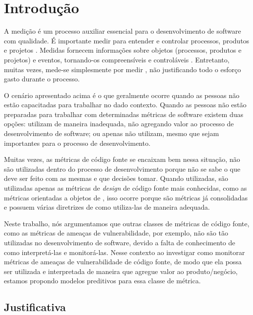 \chapter{Introdução} \label{cap:introducao}

A medição é um processo auxiliar essencial para o desenvolvimento de software
com qualidade. É importante medir para entender e controlar processos, produtos 
e projetos \cite{ministerio_processo2012}. Medidas fornecem informações sobre 
objetos (processos, produtos e projetos) e eventos, tornando-os compreensíveis 
e controláveis \cite{fenton&pfleenger98}. Entretanto, muitas vezes, mede-se
simplesmente por medir \cite{ministerio_processo2012}, não justificando todo o 
esforço gasto durante o processo.

O cenário apresentado acima é o que geralmente ocorre quando as pessoas não estão
capacitadas para trabalhar no dado contexto. Quando as pessoas não estão
preparadas para trabalhar com determinadas métricas de software existem duas opções:
utilizam de maneira inadequada, não agregando valor ao processo de desenvolvimento
de software; ou apenas não utilizam, mesmo que sejam importantes para o processo de
desenvolvimento.

Muitas vezes, as métricas de código fonte se encaixam bem nessa situação, não
são utilizadas dentro do processo de desenvolvimento porque não se sabe o que
deve ser feito com as mesmas e que decisões tomar. Quando utilizadas, são
utilizadas apenas as métricas de \textit{design} de código fonte mais
conhecidas, como as métricas orientadas a objetos de
, isso ocorre porque são métricas já
consolidadas e possuem várias diretrizes de como utiliza-las de maneira
adequada. 

Neste trabalho, nós argumentamos que outras classes de métricas de código fonte,
como as métricas de ameaças de vulnerabilidade, por exemplo, não são tão
utilizadas no desenvolvimento de software, devido a falta de conhecimento de
como interpretá-las e monitorá-las. Nesse contexto ao investigar como monitorar
métricas de ameaças de vulnerabilidade de código fonte, de modo que ela possa
ser utilizada e interpretada de maneira que agregue valor ao produto/negócio,
estamos propondo modelos preditivos para essa classe de métrica.

\section{Justificativa}

